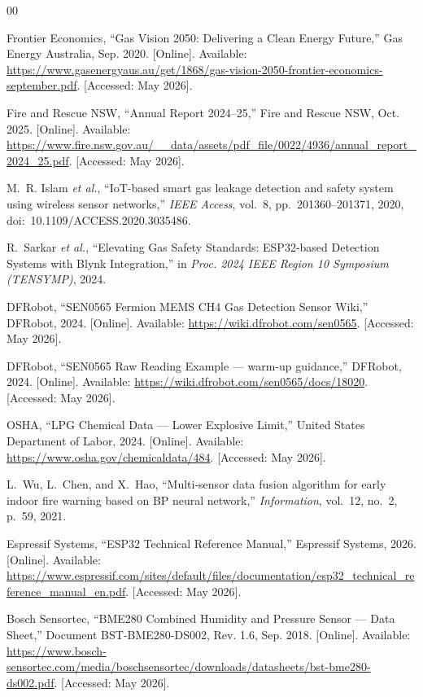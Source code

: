 \documentclass[a4paper,10pt,conference,onecolumn]{IEEEtran}
\begin{document}
\begingroup
\renewcommand{\refname}{}
\begin{thebibliography}{00}

Frontier Economics, ``Gas Vision 2050: Delivering a Clean Energy Future,'' 
Gas Energy Australia, Sep. 2020. [Online]. Available: 
\url{https://www.gasenergyaus.au/get/1868/gas-vision-2050-frontier-economics-september.pdf}. 
[Accessed: May 2026].


Fire and Rescue NSW, ``Annual Report 2024--25,'' Fire and Rescue NSW, Oct. 2025. 
[Online]. Available: 
\url{https://www.fire.nsw.gov.au/\_\_data/assets/pdf\_file/0022/4936/annual\_report\_2024\_25.pdf}. 
[Accessed: May 2026].


M.~R. Islam \textit{et al.}, ``IoT-based smart gas leakage detection and
safety system using wireless sensor networks,'' \textit{IEEE Access}, vol.~8,
pp.~201360--201371, 2020, doi:~10.1109/ACCESS.2020.3035486.

R.~Sarkar \textit{et al.}, ``Elevating Gas Safety Standards: ESP32-based
Detection Systems with Blynk Integration,'' in \textit{Proc. 2024 IEEE Region
10 Symposium (TENSYMP)}, 2024.

DFRobot, ``SEN0565 Fermion MEMS CH4 Gas Detection Sensor Wiki,'' DFRobot,
2024. [Online]. Available: \url{https://wiki.dfrobot.com/sen0565}.
[Accessed: May 2026].

DFRobot, ``SEN0565 Raw Reading Example --- warm-up guidance,'' DFRobot, 2024.
[Online]. Available: \url{https://wiki.dfrobot.com/sen0565/docs/18020}.
[Accessed: May 2026].

OSHA, ``LPG Chemical Data --- Lower Explosive Limit,'' United States Department
of Labor, 2024. [Online]. Available:
\url{https://www.osha.gov/chemicaldata/484}. [Accessed: May 2026].

L.~Wu, L.~Chen, and X.~Hao, ``Multi-sensor data fusion algorithm for early
indoor fire warning based on BP neural network,'' \textit{Information},
vol.~12, no.~2, p.~59, 2021.

Espressif Systems, ``ESP32 Technical Reference Manual,'' Espressif Systems,
2026. [Online]. Available:
\url{https://www.espressif.com/sites/default/files/documentation/esp32_technical_reference_manual_en.pdf}.
[Accessed: May 2026].

Bosch Sensortec, ``BME280 Combined Humidity and Pressure Sensor --- Data Sheet,'' 
Document BST-BME280-DS002, Rev. 1.6, Sep. 2018. [Online]. Available: 
\url{https://www.bosch-sensortec.com/media/boschsensortec/downloads/datasheets/bst-bme280-ds002.pdf}. 
[Accessed: May 2026].


\end{thebibliography}
\end{document}
